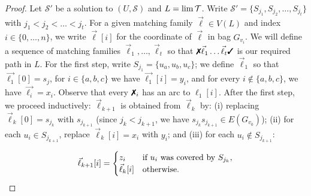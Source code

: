 \begin{proof}
  Let $\mathcal{S}'$ be a solution to $(U, \mathcal{S})$ and $L = \lim \operatorname{\mathcal{T}}$. Write $\mathcal{S}'=\{S_{j_1},S_{j_2},\ldots,S_{j_t}\}$ with $j_1<j_2<\ldots<j_t$. For a
  given matching family $\vec{\ell}\in V(L)$ and index $i \in \{0, \dots, n\}$, we write $\vec{\ell}[i]$ for the coordinate of $\vec{\ell}$ in bag $G_{v_i}$. We will define a sequence of matching families $\vec{\ell}_1,\ldots,\vec{\ell}_t$ so that $\xmark\vec{\ell}_1\ldots\vec{\ell}_t\mycmark$ is our required path in $L$.
  For the first step, write  $S_{j_1}=\{u_a, u_b, u_c\}$; we define $\vec{\ell}_1$ so that $\vec{\ell_1}[0] = s_j$, for $i \in
  \{a,b,c\}$ we have $\vec{\ell_1}[i] = y_i$, and for every $i \notin \{a,b,c\}$, we have
  $\vec{\ell_i} = x_i$. Observe that every $\xmark_i$ has an arc to $\ell_1[i]$.
  After the first step, we proceed inductively: $\vec{\ell}_{k+1}$ is
  obtained from $\vec{\ell}_{k}$ by: (i) replacing $\vec{\ell}_{k}[0] = s_{j_k}$ with
  $s_{j_{k+1}}$ (since $j_k < j_{k+1}$, we have $s_{j_k}s_{j_{k+1}} \in E(G_{v_0})$); (ii) for each
  $u_i \in S_{j_{k+1}}$, replace $\vec{\ell}_{k}[i] = x_i$ with $y_i$; and (iii) for each
  $u_i \notin S_{j_{k+1}}$:\vspace{-1.5em}

  \[
    \vec{\ell}_{k+1}[i] =
    \begin{cases}
      z_i & \text{if $u_i$ was covered by $S_{j_k}$},\\
      \vec{\ell}_{k}[i] & \text{otherwise.}
    \end{cases}\vspace{-.3em}
  \]


\end{proof}
